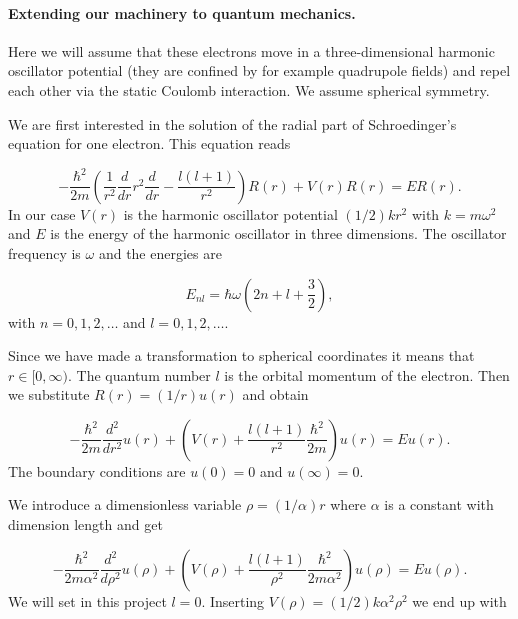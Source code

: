 \documentclass[%
oneside,                 %
final,                   %
10pt]{article}
\begin{document}
\paragraph{Extending our machinery to quantum mechanics.}
Here we will assume that these electrons move in a three-dimensional harmonic
oscillator potential (they are confined by for example quadrupole fields)
and repel  each other via the static Coulomb interaction.  
We assume spherical symmetry.  

We are first interested in the solution of the radial part of Schroedinger's equation for one electron. This equation reads

\begin{equation*}
  -\frac{\hbar^2}{2 m} \left ( \frac{1}{r^2} \frac{d}{dr} r^2
  \frac{d}{dr} - \frac{l (l + 1)}{r^2} \right )R(r) 
     + V(r) R(r) = E R(r).
\end{equation*}
In our case $V(r)$ is the harmonic oscillator potential $(1/2)kr^2$ with
$k=m\omega^2$ and $E$ is
the energy of the harmonic oscillator in three dimensions.
The oscillator frequency is $\omega$ and the energies are

\begin{equation*}
E_{nl}=  \hbar \omega \left(2n+l+\frac{3}{2}\right),
\end{equation*}
with $n=0,1,2,\dots$ and $l=0,1,2,\dots$.

Since we have made a transformation to spherical coordinates it means that 
$r\in [0,\infty)$.  
The quantum number
$l$ is the orbital momentum of the electron.  
% 
Then we substitute $R(r) = (1/r) u(r)$ and obtain
% 

\begin{equation*}
  -\frac{\hbar^2}{2 m} \frac{d^2}{dr^2} u(r) 
       + \left ( V(r) + \frac{l (l + 1)}{r^2}\frac{\hbar^2}{2 m}
                                    \right ) u(r)  = E u(r) .
\end{equation*}
% 
The boundary conditions are $u(0)=0$ and $u(\infty)=0$.

We introduce a dimensionless variable $\rho = (1/\alpha) r$
where $\alpha$ is a constant with dimension length and get
% 

\begin{equation*}
  -\frac{\hbar^2}{2 m \alpha^2} \frac{d^2}{d\rho^2} u(\rho) 
       + \left ( V(\rho) + \frac{l (l + 1)}{\rho^2}
         \frac{\hbar^2}{2 m\alpha^2} \right ) u(\rho)  = E u(\rho) .
\end{equation*}
% 
We will set in this project $l=0$.
Inserting $V(\rho) = (1/2) k \alpha^2\rho^2$ we end up with
\end{document}
